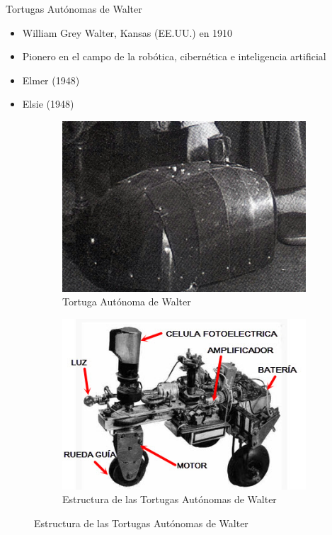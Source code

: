 \begin{frame}[fragile]{Tortugas Autónomas de Walter}
	\vspace{10px}
	\pause
	\begin{block}{}
		\begin{itemize}
			\item William Grey Walter, Kansas (EE.UU.) en 1910
			\pause
			\item Pionero en el campo de la robótica, cibernética e inteligencia artificial
			\pause
			\item Elmer (1948)
			\pause
			\item Elsie (1948)
		\end{itemize}
	\end{block}
	\begin{figure}
		\centering
		\pause
		\begin{subfigure}{0.48\textwidth}
			\centering
			\includegraphics[scale=0.5]{./EtapaPrimeriza/imagenes/tortuga.jpg}
			\caption{Tortuga Autónoma de Walter}
		\end{subfigure}
		\pause
		\begin{subfigure}{0.48\textwidth}
			\centering
			\includegraphics[scale=0.5]{./EtapaPrimeriza/imagenes/t1.jpg}
			\caption{Estructura de las Tortugas Autónomas de Walter}
		\end{subfigure}
	\end{figure}
\end{frame}

